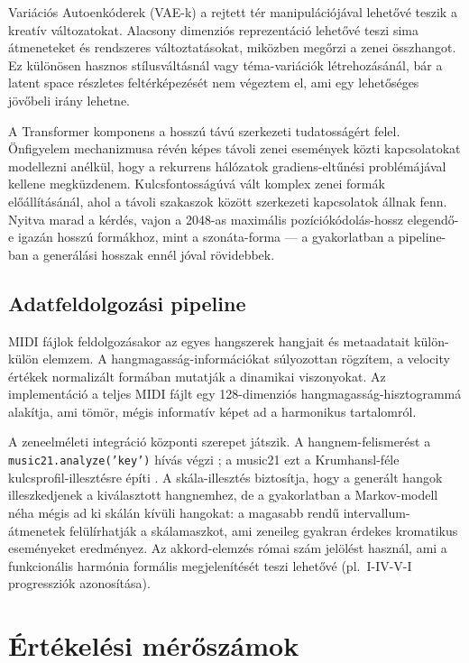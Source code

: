 Variációs Autoenkóderek (VAE-k) a rejtett tér manipulációjával lehetővé teszik a kreatív változatokat. Alacsony dimenziós reprezentáció lehetővé teszi sima átmeneteket és rendszeres változtatásokat, miközben megőrzi a zenei összhangot. Ez különösen hasznos stílusváltásnál vagy téma-variációk létrehozásánál, bár a latent space részletes feltérképezését nem végeztem el, ami egy lehetőséges jövőbeli irány lehetne.

A Transformer komponens a hosszú távú szerkezeti tudatosságért felel. Önfigyelem mechanizmusa révén képes távoli zenei események közti kapcsolatokat modellezni anélkül, hogy a rekurrens hálózatok gradiens-eltűnési problémájával kellene megküzdenem. Kulcsfontosságúvá vált komplex zenei formák előállításánál, ahol a távoli szakaszok között szerkezeti kapcsolatok állnak fenn. Nyitva marad a kérdés, vajon a 2048-as maximális pozíciókódolás-hossz elegendő-e igazán hosszú formákhoz, mint a szonáta-forma --- a gyakorlatban a pipeline-ban a generálási hosszak ennél jóval rövidebbek.

\subsection{Adatfeldolgozási pipeline}

MIDI fájlok feldolgozásakor az egyes hangszerek hangjait és metaadatait külön-külön elemzem. A hangmagasság-információkat súlyozottan rögzítem, a velocity értékek normalizált formában mutatják a dinamikai viszonyokat. Az implementáció a teljes MIDI fájlt egy 128-dimenziós hangmagasság-hisztogrammá alakítja, ami tömör, mégis informatív képet ad a harmonikus tartalomról.

A zeneelméleti integráció központi szerepet játszik. A hangnem-felismerést a \texttt{music21.analyze('key')} hívás végzi \cite{music21}; a music21 ezt a Krumhansl-féle kulcsprofil-illesztésre építi \cite{krumhansl1990cognitive}. A skála-illesztés biztosítja, hogy a generált hangok illeszkedjenek a kiválasztott hangnemhez, de a gyakorlatban a Markov-modell néha mégis ad ki skálán kívüli hangokat: a magasabb rendű intervallum-átmenetek felülírhatják a skálamaszkot, ami zeneileg gyakran érdekes kromatikus eseményeket eredményez. Az akkord-elemzés római szám jelölést használ, ami a funkcionális harmónia formális megjelenítését teszi lehetővé (pl.\ I-IV-V-I progressziók azonosítása).

\section{Értékelési mérőszámok}

